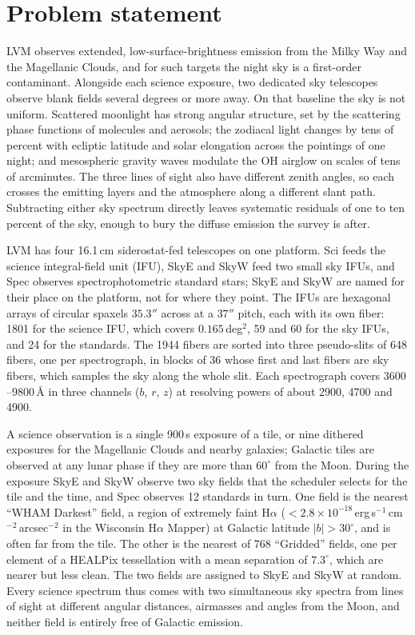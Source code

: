 \section{Problem statement}
\label{sec:problem}

LVM \citep{Drory2024} observes extended, low-surface-brightness emission from
the Milky Way and the Magellanic Clouds, and for such targets the night sky
is a first-order contaminant. Alongside each science exposure, two dedicated
sky telescopes observe blank fields several degrees or more away. On that
baseline the sky is not uniform. Scattered moonlight has strong angular
structure, set by the scattering phase functions of molecules and aerosols; the zodiacal light
changes by tens of percent with ecliptic latitude and solar elongation
across the pointings of one night; and mesospheric gravity waves modulate the
OH airglow on scales of tens of arcminutes. The three lines of sight also
have different zenith angles, so each crosses the emitting layers and the
atmosphere along a different slant path. Subtracting either sky spectrum
directly leaves systematic residuals of one to ten percent of the sky, enough
to bury the diffuse emission the survey is after.

LVM has four 16.1\,cm siderostat-fed telescopes on one platform. Sci feeds the
science integral-field unit (IFU), SkyE and SkyW feed two small sky IFUs, and
Spec observes spectrophotometric standard stars; SkyE and SkyW are named for
their place on the platform, not for where they point. The IFUs are
hexagonal arrays of circular spaxels $35.3''$ across at a $37''$ pitch, each
with its own fiber: 1801 for the science IFU, which covers $0.165$\,deg$^2$,
59 and 60 for the sky IFUs, and 24 for the standards. The 1944 fibers are
sorted into three pseudo-slits of 648 fibers, one per spectrograph, in blocks
of 36 whose first and last fibers are sky fibers, which samples the sky along
the whole slit. Each spectrograph covers $3600$--$9800$\,\AA{} in three
channels ($b$, $r$, $z$) at resolving powers of about 2900, 4700 and 4900.

A science observation is a single 900\,s exposure of a tile, or nine dithered
exposures for the Magellanic Clouds and nearby galaxies; Galactic tiles are
observed at any lunar phase if they are more than $60^\circ$ from the Moon.
During the exposure SkyE and SkyW observe two sky fields that the scheduler
selects for the tile and the time, and Spec observes 12 standards in turn. One
field is the nearest ``WHAM Darkest'' field, a region of extremely faint
H$\alpha$ ($<2.8\times10^{-18}$\,erg\,s$^{-1}$\,cm$^{-2}$\,arcsec$^{-2}$ in the
Wisconsin H$\alpha$ Mapper) at Galactic latitude $|b|>30^\circ$, and is often
far from the tile. The other is the nearest of 768 ``Gridded'' fields, one per
element of a HEALPix tessellation with a mean separation of $7.3^\circ$, which
are nearer but less clean. The two fields are assigned to SkyE and SkyW at
random. Every science spectrum thus comes with two simultaneous sky spectra
from lines of sight at different angular distances, airmasses and angles from
the Moon, and neither field is entirely free of Galactic emission.

